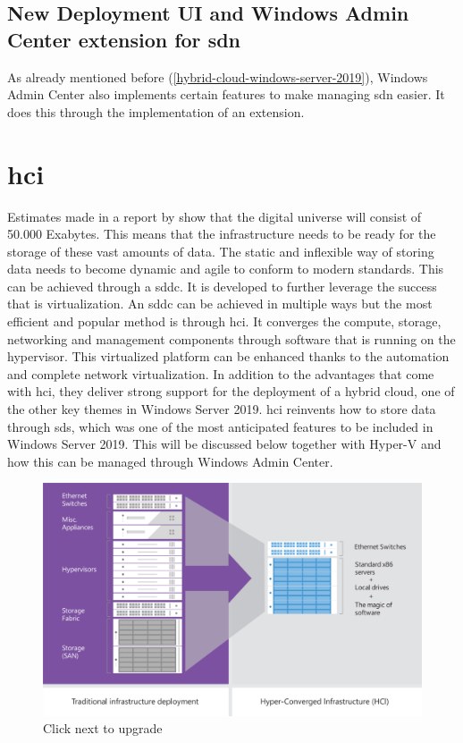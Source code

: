 \subsection*{New Deployment UI and Windows Admin Center extension for \acrshort{sdn}}
As already mentioned before (\ref{hybrid-cloud-windows-server-2019}), Windows Admin Center also implements certain features to make managing \acrshort{sdn} easier. It does this through the implementation of an extension.

\section{\acrfull{hci}}
Estimates made in a report by \textcite{Gantz2012} show that the digital universe will consist of 50.000 Exabytes. This means that the infrastructure needs to be ready for the storage of these vast amounts of data. The static and inflexible way of storing data needs to become dynamic and agile to conform to modern standards. This can be achieved through a \acrfull{sddc}. It is developed to further leverage the success that is virtualization. An \acrshort{sddc} can be achieved in multiple ways but the most efficient and popular method is through \acrfull{hci}. It converges the compute, storage, networking and management components through software that is running on the hypervisor. This virtualized platform can be enhanced thanks to the automation and complete network virtualization. In addition to the advantages that come with \acrshort{hci}, they deliver strong support for the deployment of a hybrid cloud, one of the other key themes in Windows Server 2019. 
\acrshort{hci} reinvents how to store data through \acrfull{sds}, which was one of the most anticipated features to be included in Windows Server 2019. This will be discussed below together with Hyper-V and how this can be managed through Windows Admin Center. \autocite{Haag2016}
\begin{figure}[h]
	\includegraphics[width=0.6\linewidth]{img/HCI.png}
	\captionsetup{width=0.5\linewidth}
	\centering		
	\caption{Click next to upgrade}
	\label{fig:HCI}
\end{figure}

